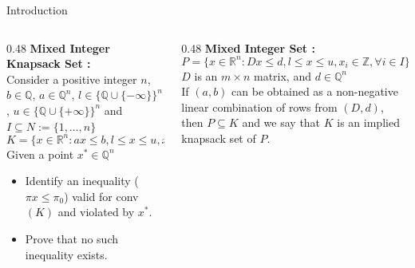 \documentclass[aspectratio=169,xcolor=dvipsnames]{beamer}
\begin{document}
\begin{frame}{Introduction}
    \vspace{-0.2cm}
    \begin{columns}[T]
        \begin{column}{0.48\textwidth}
            \textbf{Mixed Integer Knapsack Set :} \\
            \small
            Consider a positive integer $n$, $b \in \mathbb{Q}$, $a \in \mathbb{Q}^n$, $l \in \{\mathbb{Q} \cup \{-\infty\}\}^n$, $u \in \{\mathbb{Q} \cup \{+\infty\}\}^n$ and $I \subseteq N := \{1, \ldots, n\}$
            \[
            K = \{x \in \mathbb{R}^n : ax \leq b, l \leq x \leq u, x_i \in \mathbb{Z}, \forall i \in I \}
            \]
            Given a point $x^* \in \mathbb{Q}^n$
            \begin{itemize}
                \item Identify an inequality ($\pi x \leq \pi_0$) valid for conv$(K)$ and violated by $x^*$.
                \item Prove that no such inequality exists.
            \end{itemize}
        \end{column}
        \hspace{0.5cm}
        \begin{column}{0.48\textwidth}
            \textbf{Mixed Integer Set : } \\
            \vspace{-0.4cm}
            \small
            \[
            P = \{x \in \mathbb{R}^n : Dx \leq d, l \leq x \leq u, x_i \in \mathbb{Z}, \forall i \in I \}
            \]
            $D$ is an $m \times n$ matrix, and $d \in \mathbb{Q}^n$\\
            \vspace{0.3cm}
            If $(a, b)$ can be obtained as a non-negative linear combination of rows from $(D, d)$, then $P \subseteq K$ 
            and we say that $K$ is an implied knapsack set of $P$. 
        \end{column}
    \end{columns}
\end{frame}
\end{document}
